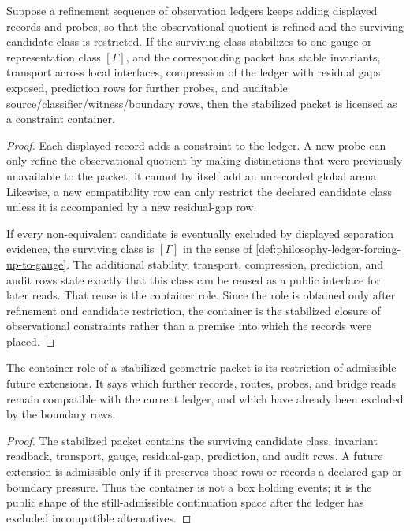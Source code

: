 \begin{theorem}
\label{thm:philosophy-constraint-closure-becomes-container}
Suppose a refinement sequence of observation ledgers keeps adding displayed
records and probes, so that the observational quotient is refined and the
surviving candidate class is restricted. If the surviving class stabilizes
to one gauge or representation class $[\Gamma]$, and the corresponding packet
has stable invariants, transport across local interfaces, compression of the
ledger with residual gaps exposed, prediction rows for further probes, and
auditable source/classifier/witness/boundary rows, then the stabilized packet
is licensed as a constraint container.
\end{theorem}
\begin{proof}
Each displayed record adds a constraint to the ledger. A new probe can only
refine the observational quotient by making distinctions that were previously
unavailable to the packet; it cannot by itself add an unrecorded global arena.
Likewise, a new compatibility row can only restrict the declared candidate
class unless it is accompanied by a new residual-gap row.

If every non-equivalent candidate is eventually excluded by displayed
separation evidence, the surviving class is $[\Gamma]$ in the sense of
\autoref{def:philosophy-ledger-forcing-up-to-gauge}. The additional stability,
transport, compression, prediction, and audit rows state exactly that this
class can be reused as a public interface for later reads. That reuse is the
container role. Since the role is obtained only after refinement and
candidate restriction, the container is the stabilized closure of
observational constraints rather than a premise into which the records were
placed.
\end{proof}

\begin{corollary}
\label{cor:philosophy-containers-delimit-future-extensions}
The container role of a stabilized geometric packet is its restriction of
admissible future extensions. It says which further records, routes, probes,
and bridge reads remain compatible with the current ledger, and which have
already been excluded by the boundary rows.
\end{corollary}
\begin{proof}
The stabilized packet contains the surviving candidate class, invariant
readback, transport, gauge, residual-gap, prediction, and audit rows. A
future extension is admissible only if it preserves those rows or records a
declared gap or boundary pressure. Thus the container is not a box holding
events; it is the public shape of the still-admissible continuation space
after the ledger has excluded incompatible alternatives.
\end{proof}

